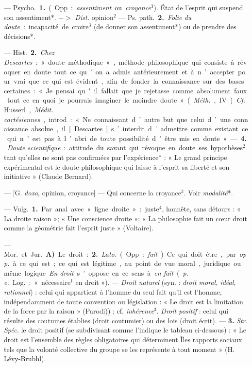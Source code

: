 \begin{itemize}[leftmargin=1cm, label=, itemsep=1pt]
 — \si{Psycho.} {\bf 1.} (Opp. :
{\it assentiment} ou {\it croyance}$^3$). État de l'esprit
qui suspend son assentiment*.
$->$ {\it Dist.} opinion$^2$ — \si{Ps. path.}
 {\bf 2.} {\it Folie du doute} : incapacité de
croire$^3$ (de donner son assentiment*)
ou de prendre des décisions*.

— \si{Hist.} {\bf 2.} {\it Chez Descartes} : « doute
méthodique », méthode philosophique qui consiste à révoquer en
doute tout ce qu’on a admis antérieurement et à n’accepter pour vrai
que ce qui est évident, afin de fonder
la connaissance sur des bases certaines : « Je pensai qu'il fallait que
je rejetasse comme absolument faux
tout ce en quoi je pourrais imaginer
le moindre doute » ({\it Méth.}, IV). {\it Cf.}
Husserl, {\it Médit. cartésiennes}, introd. :
« Ne connaissant d’autre but que
celui d’une connaissance absolue,
il [Descartes] s’interdit d'admettre
comme existant ce qui n’est pas à
l’abri de toute possibilité d’être mis
en doute ». — {\bf 4.} {\it Doute scientifique} :
attitude du savant qui révoque en
doute ses hypothèses$^2$ tant qu’elles
ne sont pas confirmées par l’expérience* : « Le grand principe expérimental est le doute philosophique
qui laisse à l’esprit sa liberté et son
initiative » (Claude Bernard).

 — [G. {\it doxa}, opinion, croyance]
— Qui concerne la croyance$^3$. Voir
{\it modalité}*.

 — \si{Vulg.} {\bf 1.} Par anal. avec
« ligne droite » : juste$^4$, honnête, sans
détours : « La droite raison »; « Une
conscience droite »; « La philosophie
fait un cœur droit comme la géométrie fait l'esprit juste » (Voltaire).

 — \si{Mor.} et \si{Jur.} {\bf A)} Le
droit : {\bf 2.} {\it Lato.} (Opp. : {\it fait}). Ce qui
doit être, par {\it opp.} à ce qui est; ce
qui est légitime, au point de vue
moral, juridique ou même logique.
{\it En droit} s’oppose en ce sens à {\it en fait}
({\it p. e.} \si{Log.} : « nécessaire$^1$ en droit »).
— {\it Droit naturel} (syn. : {\it droit moral,
idéal, rationnel}) : celui qui appartient
à l’homme du seul fait qu'il est
l’homme, indépendamment de toute
convention ou législation : « Le droit
est la limitation de la force par la
raison » (Parodi)) ; cf. {\it inhérence}$^3$. {\it Droit
positif} : celui qui résulte des coutumes établies (droit coutumier) ou
des lois (droit écrit). — {\bf 3.} {\it Str.} {\it Spéc.}
le droit positif (se subdivisant comme
l'indique le tableau ci-dessous) :
« Le droit est l’ensemble des règles
obligatoires qui déterminent Îles
rapports sociaux tels que la volonté
collective du groupe se les représente
à tout moment » (H. Lévy-Brubhl).


\end{itemize}
